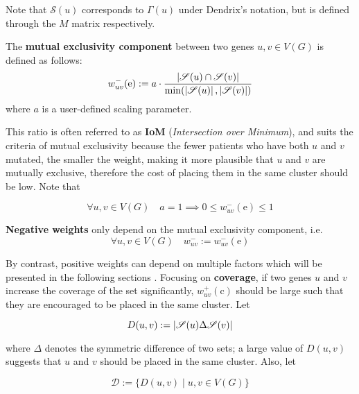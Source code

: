 Note that $\mathscr{S}(u)$ corresponds to $\Gamma(u)$ under Dendrix's notation, but is defined through the $M$ matrix respectively.

\begin{definition} \label{me_comp}
    The \textbf{mutual exclusivity component} between two genes $u, v \in V(G)$ is defined as follows: $$w_{uv}^-(\mathrm e) := a \cdot \dfrac{\left|\mathscr{S}(u) \cap \mathscr{S}(v)\right|}{\min(\left|\mathscr{S}(u)\right|, \left|\mathscr{S}(v)\right|)}$$ where $a$ is a user-defined scaling parameter.
\end{definition}

This ratio is often referred to as \textbf{IoM} (\textit{Intersection over Minimum}), and suits the criteria of mutual exclusivity because the fewer patients who have both $u$ and $v$ mutated, the smaller the weight, making it more plausible that $u$ and $v$ are mutually exclusive, therefore the cost of placing them in the same cluster should be low. Note that

\begin{equation}\label{neg_weight_constraint}
    \forall u, v \in V(G) \quad a = 1 \implies 0 \le w_{uv}^-(\mathrm e) \le 1
\end{equation}

\begin{definition} \label{neg_weights}
    \textbf{Negative weights} only depend on the mutual exclusivity component, i.e. $$\forall u, v \in V(G) \quad w_{uv}^- := w_{uv}^-(\mathrm e)$$
\end{definition}

By contrast, positive weights can depend on multiple factors which will be presented in the following sections . Focusing on \textbf{coverage}, if two genes $u$ and $v$ increase the coverage of the set significantly, $w_{uv}^+(\mathrm c)$ should be large such that they are encouraged to be placed in the same cluster. Let

\begin{equation}
    D(u, v) := \left|\mathscr{S}(u) \Delta \mathscr{S}(v)\right|
\end{equation}

where $\Delta$ denotes the symmetric difference of two sets; a large value of $D(u, v)$ suggests that $u$ and $v$ should be placed in the same cluster. Also, let

\begin{equation}
    \mathscr{D} := \{D(u, v) \mid u, v \in V(G)\}
\end{equation}

